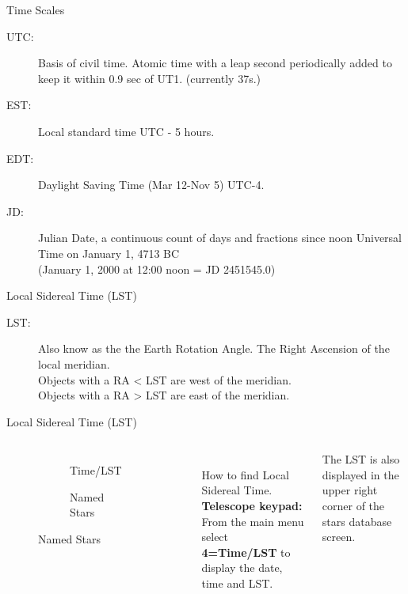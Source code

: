 \begin{frame}[t]{Time Scales}
  \Large
  \begin{description}
    \item[UTC:] Basis of civil time. Atomic time with a leap second periodically added to keep
     it within 0.9 sec of UT1. (currently 37s.)
    \item[EST:] Local standard time UTC - 5 hours.
    \item[EDT:] Daylight Saving Time (Mar 12-Nov 5) UTC-4.
    \item[JD:] Julian Date, a continuous count of days and fractions since noon Universal Time on January 1, 4713 BC \\
    (January 1, 2000 at 12:00 noon = JD 2451545.0)
  \end{description}
\end{frame}


\begin{frame}[t]{Local Sidereal Time (LST)}
  \Large
  \begin{description}
    \item[LST:] Also know as the the Earth Rotation Angle.
    The Right Ascension of the local meridian.\\[1ex]

    Objects with a RA < LST are west of the meridian.\\
    
    Objects with a RA > LST are east of the meridian.
    \end{description}

\end{frame}


\begin{frame}{Local Sidereal Time (LST)}
  \begin{columns}[T]
      \begin{figure}[ht]
          \begin{subfigure}{0.7\textwidth}
          \caption{Time/LST}
        \end{subfigure}
        \vspace{\fill}
        \begin{subfigure}{0.7\textwidth}
          \caption{Named Stars}
        \end{subfigure}
      \end{figure}
    \ \\[1ex]
    How to find Local Sidereal Time.\\[1.5ex]

    \textbf{Telescope keypad:} From the main menu select \textbf{4=Time/LST} to display the date,
    time and LST.

    The LST is also displayed in the upper right corner of the stars database screen.
  \end{columns}

\end{frame}


